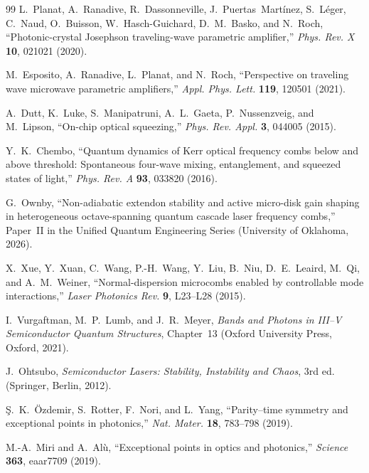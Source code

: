 \documentclass[11pt,letterpaper]{article}
\theoremstyle{definition}
\theoremstyle{remark}
\begin{document}
\begin{thebibliography}{99}
L.~Planat, A.~Ranadive, R.~Dassonneville, J.~Puertas~Mart\'inez, S.~L\'eger, C.~Naud, O.~Buisson, W.~Hasch-Guichard, D.~M.~Basko, and N.~Roch, ``Photonic-crystal Josephson traveling-wave parametric amplifier,'' \textit{Phys. Rev. X} \textbf{10}, 021021 (2020).

M.~Esposito, A.~Ranadive, L.~Planat, and N.~Roch, ``Perspective on traveling wave microwave parametric amplifiers,'' \textit{Appl. Phys. Lett.} \textbf{119}, 120501 (2021).

A.~Dutt, K.~Luke, S.~Manipatruni, A.~L.~Gaeta, P.~Nussenzveig, and M.~Lipson, ``On-chip optical squeezing,'' \textit{Phys. Rev. Appl.} \textbf{3}, 044005 (2015).

Y.~K.~Chembo, ``Quantum dynamics of Kerr optical frequency combs below and above threshold: Spontaneous four-wave mixing, entanglement, and squeezed states of light,'' \textit{Phys. Rev. A} \textbf{93}, 033820 (2016).

G.~Ownby, ``Non-adiabatic extendon stability and active micro-disk gain shaping in heterogeneous octave-spanning quantum cascade laser frequency combs,'' Paper~II in the Unified Quantum Engineering Series (University of Oklahoma, 2026).

X.~Xue, Y.~Xuan, C.~Wang, P.-H.~Wang, Y.~Liu, B.~Niu, D.~E.~Leaird, M.~Qi, and A.~M.~Weiner, ``Normal-dispersion microcombs enabled by controllable mode interactions,'' \textit{Laser Photonics Rev.} \textbf{9}, L23--L28 (2015).

I.~Vurgaftman, M.~P.~Lumb, and J.~R.~Meyer, \textit{Bands and Photons in III--V Semiconductor Quantum Structures}, Chapter~13 (Oxford University Press, Oxford, 2021).

J.~Ohtsubo, \textit{Semiconductor Lasers: Stability, Instability and Chaos}, 3rd ed. (Springer, Berlin, 2012).

\c{S}.~K.~\"Ozdemir, S.~Rotter, F.~Nori, and L.~Yang, ``Parity--time symmetry and exceptional points in photonics,'' \textit{Nat. Mater.} \textbf{18}, 783--798 (2019).

M.-A.~Miri and A.~Al\`u, ``Exceptional points in optics and photonics,'' \textit{Science} \textbf{363}, eaar7709 (2019).

\end{thebibliography}
\end{document}
